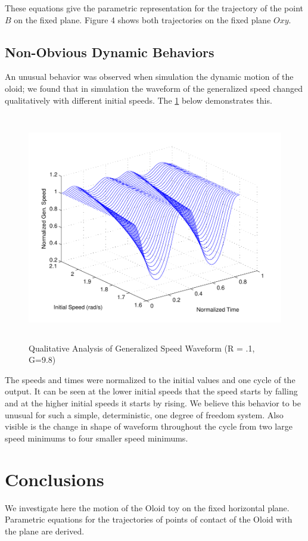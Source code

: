 \documentclass[10pt]{enoc2011}
\begin{document}
These equations give the parametric representation for the trajectory of the point $B$ on the fixed plane. Figure 4 shows both trajectories on the fixed plane $Oxy$.

\subsection{Non-Obvious Dynamic Behaviors}
An unusual behavior was observed when simulation the dynamic motion of the oloid; we found that in simulation the waveform of the generalized speed changed qualitatively with different initial speeds.  The \ref{waveform} below demonstrates this. 
\begin{figure}[h!]
  \label{waveform}
  \centering\includegraphics[height=10cm]{Waveform}
\caption{Qualitative Analysis of Generalized Speed Waveform (R = .1, G=9.8)}
\end{figure}
The speeds and times were normalized to the initial values and one cycle of the output.  It can be seen at the lower initial speeds that the speed starts by falling and at the higher initial speeds it starts by rising.  We believe this behavior to be unusual for such a simple, deterministic, one degree of freedom system.  Also visible is the change in shape of waveform throughout the cycle from two large speed minimums to four smaller speed minimums.   


\section{Conclusions}
We investigate here the motion of the Oloid toy on the fixed horizontal plane. Parametric equations for the trajectories of points of contact of the Oloid with the plane are derived.
\end{document}
